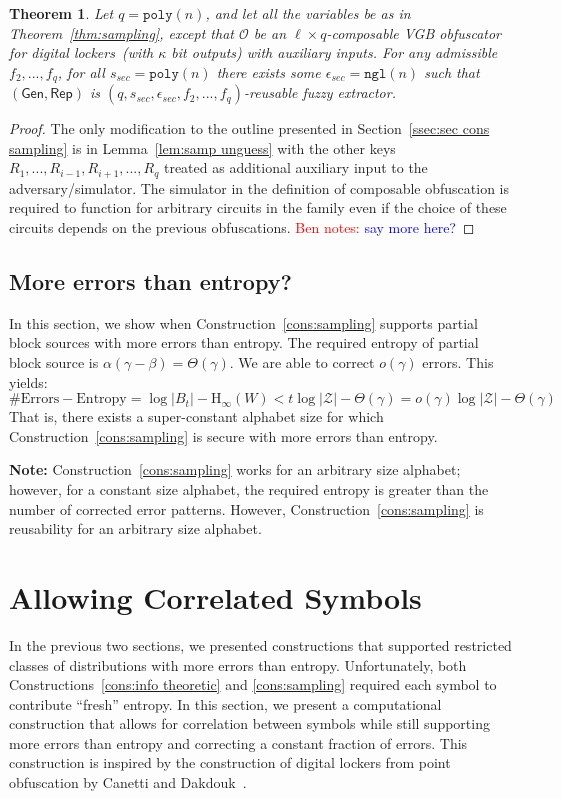 \documentclass[11pt]{article}
\newcommand{\secref}[1]{\mbox{Section~\ref{#1}}}
\newcommand{\thref}[1]{\mbox{Theorem~\ref{#1}}}
\newcommand{\lemref}[1]{\mbox{Lemma~\ref{#1}}}
\newcommand{\consref}[1]{\mbox{Construction~\ref{#1}}}
\newcommand{\class}[1]{{\ensuremath{\mathsf{#1}}}}
\newcommand{\gen}{\ensuremath{\class{Gen}}\xspace}
\newcommand{\rep}{\ensuremath{\class{Rep}}\xspace}
\newcommand{\poly}{\ensuremath{\mathtt{poly}}\xspace}
\newcommand{\ngl}{\ensuremath{\mathtt{ngl}}\xspace}
\newcommand{\Hoo}{\mathrm{H}_\infty}
\newtheorem{theorem}{Theorem}[section]
\newcommand{\authnote}[2]{{\textcolor{red}{\textsf{#1 notes: }\textcolor{blue}{ #2}}\marginpar{\textcolor{red}{\textbf{!!!!!}}}}}
\newcommand{\authnote}[2]{}
\newcommand{\bnote}[1]{{\authnote{Ben}{#1}}}
\begin{document}
\begin{theorem}
\label{thm:reusability}
Let $q = \poly(n)$, and let all the variables be as in \thref{thm:sampling}, except that $\mathcal{O}$ be an $\ell\times q$-composable VGB obfuscator for digital lockers~(with $\kappa$ bit outputs) with auxiliary inputs.  For any admissible $f_2,..., f_q$, for all $s_{sec} = \poly(n)$ there exists some $\epsilon_{sec} = \ngl(n)$ such that $(\gen, \rep)$ is $(q, s_{sec}, \epsilon_{sec}, f_2,..., f_q)$-reusable fuzzy extractor.
\end{theorem}
\begin{proof}
The only modification to the outline presented in \secref{ssec:sec cons sampling} is in \lemref{lem:samp unguess} with the other keys $R_1,..., R_{i-1}, R_{i+1}, ..., R_q$ treated as additional auxiliary input to the adversary/simulator.  The simulator in the definition of composable obfuscation is required to function for arbitrary circuits in the family even if the choice of these circuits depends on the previous obfuscations.
\bnote{say more here?}
\end{proof}

\subsection{More errors than entropy?}
In this section, we show when \consref{cons:sampling} supports partial block sources with more errors than entropy.  The required entropy of partial block source is $\alpha (\gamma-\beta ) = \Theta(\gamma)$.  We are able to correct $o(\gamma)$ errors.
This yields:
\[
\text{\# Errors} - \text{Entropy} =  \log |B_t| -\Hoo(W) < t \log |\mathcal{Z}| - \Theta(\gamma)= o(\gamma) \log |\mathcal{Z}| - \Theta(\gamma)
\]
That is, there exists a super-constant alphabet size for which \consref{cons:sampling} is secure with more errors than entropy.  

\textbf{Note:} \consref{cons:sampling} works for an arbitrary size alphabet; however, for a constant size alphabet, the required entropy is greater than the number of corrected error patterns.  However, \consref{cons:sampling} is reusability for an arbitrary size alphabet.

\section{Allowing Correlated Symbols}
\label{sec:cor construction}
In the previous two sections, we presented constructions that supported restricted classes of distributions with more errors than entropy.  Unfortunately, both Constructions~\ref{cons:info theoretic} and \ref{cons:sampling} required each symbol to contribute ``fresh'' entropy.  In this section, we present a computational construction that allows for correlation between symbols while still supporting more errors than entropy and correcting a constant fraction of errors.
This construction is inspired by the construction of digital lockers from point obfuscation by Canetti and Dakdouk~\cite{canetti2008obfuscating}.
\end{document}
